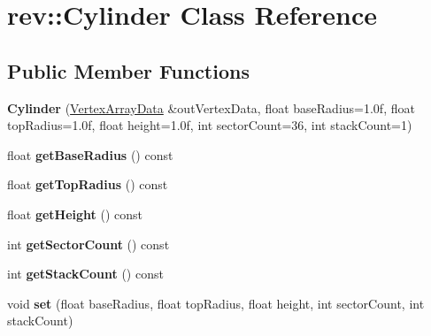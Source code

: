 \hypertarget{classrev_1_1_cylinder}{}\section{rev\+::Cylinder Class Reference}
\label{classrev_1_1_cylinder}
\subsection*{Public Member Functions}
\begin{DoxyCompactItemize}
\item 
\mbox{\label{classrev_1_1_cylinder_a3ac63148d83c97ef8a04a4512382421f}} 
{\bfseries Cylinder} (\mbox{\hyperlink{classrev_1_1_vertex_array_data}{Vertex\+Array\+Data}} \&out\+Vertex\+Data, float base\+Radius=1.\+0f, float top\+Radius=1.\+0f, float height=1.\+0f, int sector\+Count=36, int stack\+Count=1)
\item 
\mbox{\label{classrev_1_1_cylinder_aa378283ff10920e55ca683b84a9006d7}} 
float {\bfseries get\+Base\+Radius} () const
\item 
\mbox{\label{classrev_1_1_cylinder_ac669784eddc701e26886df1c5a4a5a93}} 
float {\bfseries get\+Top\+Radius} () const
\item 
\mbox{\label{classrev_1_1_cylinder_adb1ed31fff58a38d8c0e1e97af00b167}} 
float {\bfseries get\+Height} () const
\item 
\mbox{\label{classrev_1_1_cylinder_ab97fe4511d78a06e679aa6d6f320011a}} 
int {\bfseries get\+Sector\+Count} () const
\item 
\mbox{\label{classrev_1_1_cylinder_a206ae58d5b16dc2eb40a6e333dcdce60}} 
int {\bfseries get\+Stack\+Count} () const
\item 
\mbox{\label{classrev_1_1_cylinder_a384c239f9c9c2650f4406b2cda4982b7}} 
void {\bfseries set} (float base\+Radius, float top\+Radius, float height, int sector\+Count, int stack\+Count)
\item 
\mbox{\label{classrev_1_1_cylinder_ac3daa30f05d917a45d2fc8761d4ed85e}} 

\end{DoxyCompactItemize}
